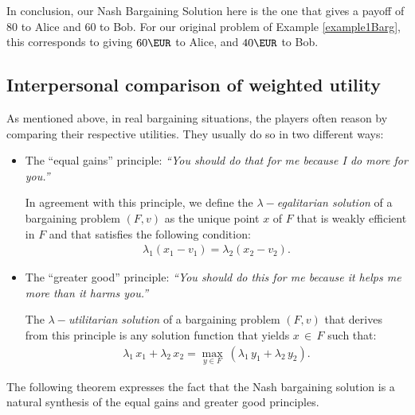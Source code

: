 \begin{example}
\begin{itemize}
\end{itemize}

In conclusion, our Nash Bargaining Solution here is the one that gives a payoff of $80$ to Alice and $60$ to Bob. For our original problem of Example \ref{example1Barg}, this corresponds to giving $60 \EUR$ to Alice, and $40 \EUR$ to Bob.


\end{example}

\subsection{Interpersonal comparison of weighted utility} \label{sec:egalitarian-utilitarian}



As mentioned above, in real bargaining situations, the players often reason by comparing their respective utilities. They usually do so in two different ways:
\begin{itemize}
\renewcommand{\labelitemi}{$\bullet$}
	\item The ``equal gains'' principle: \emph{``You should do that for me because I do more for you.''}

	In agreement with this principle, we define the \emph{$\lambda-$egalitarian solution} of a bargaining problem $(F, v)$ as the unique point $x$ of $F$ that is weakly efficient in $F$ and that satisfies the following condition:
	\begin{align*}
		\lambda_1 (x_1 - v_1) = \lambda_2 (x_2 - v_2).
	\end{align*}

	\item The ``greater good'' principle: \emph{``You should do this for me because it helps me more than it harms you.''}

	The \emph{$\lambda-$utilitarian solution} of a bargaining problem $(F, v)$ that derives from this principle is any solution function that yields $x \, \in \, F$ such that:
	\begin{align*}
		\lambda_1 \, x_1 + \lambda_2 \, x_2 = \max_{y \in F} \ (\lambda_1 \, y_1 + \lambda_2 \, y_2).
	\end{align*}
\end{itemize}
The following theorem expresses the fact that the Nash bargaining solution is a natural synthesis of the equal gains and greater good principles.

